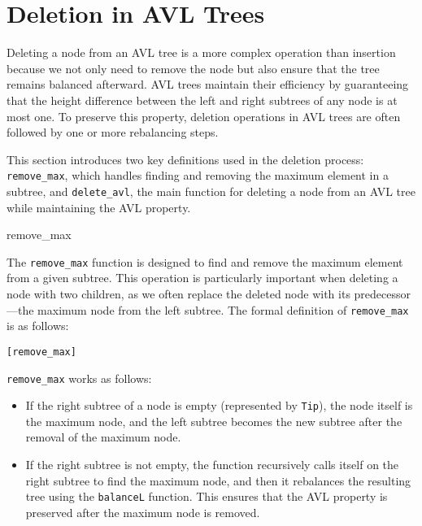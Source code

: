 \chapter{Deletion in AVL Trees}\label{chap:LaTeXAdvice}

Deleting a node from an AVL tree is a more complex operation than insertion because we not only need to remove the node but also ensure that the tree remains balanced afterward. AVL trees maintain their efficiency by guaranteeing that the height difference between the left and right subtrees of any node is at most one. To preserve this property, deletion operations in AVL trees are often followed by one or more rebalancing steps.

This section introduces two key definitions used in the deletion process: \texttt{remove\_max}, which handles finding and removing the maximum element in a subtree, and \texttt{delete\_avl}, the main function for deleting a node from an AVL tree while maintaining the AVL property.

\begin{defn}{remove\_max}

The \texttt{remove\_max} function is designed to find and remove the maximum element from a given subtree. This operation is particularly important when deleting a node with two children, as we often replace the deleted node with its predecessor—the maximum node from the left subtree. The formal definition of \texttt{remove\_max} is as follows:


\begin{alltt}
	[remove_max]
\end{alltt}

\end{defn}


\texttt{remove\_max} works as follows:
\begin{itemize}
    \item If the right subtree of a node is empty (represented by \texttt{Tip}), the node itself is the maximum node, and the left subtree becomes the new subtree after the removal of the maximum node.
    \item If the right subtree is not empty, the function recursively calls itself on the right subtree to find the maximum node, and then it rebalances the resulting tree using the \texttt{balanceL} function. This ensures that the AVL property is preserved after the maximum node is removed.
\end{itemize}

